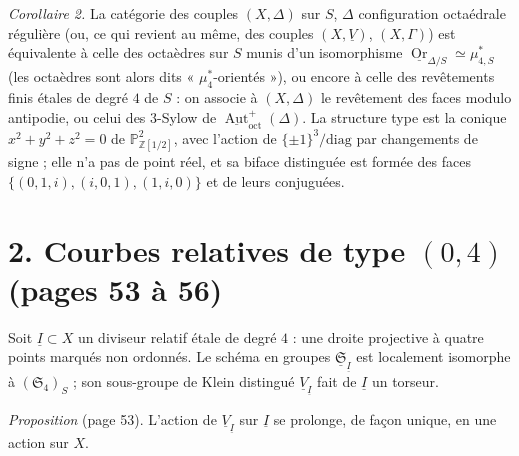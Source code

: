 \documentclass[11pt,a4paper]{article}
\begin{document}
\emph{Corollaire 2.} La catégorie des couples $(X, \Delta)$ sur $S$, $\Delta$
configuration octaédrale régulière (ou, ce qui revient au même, des couples
$(X, \underline{V})$, $(X, \Gamma)$) est équivalente à celle des octaèdres
sur $S$ munis d'un isomorphisme $\underline{\operatorname{Or}}_{\Delta/S}
\simeq \mu^{*}_{4,S}$ (les octaèdres sont alors dits « $\mu_4^{*}$-orientés »), ou encore à celle des
revêtements finis étales de degré $4$ de $S$ : on associe à $(X, \Delta)$ le
revêtement des faces modulo antipodie, ou celui des $3$-Sylow de
$\underline{\operatorname{Aut}}^{+}_{\mathrm{oct}}(\Delta)$. La structure type
est la conique $x^2 + y^2 + z^2 = 0$ de $\mathbb{P}^2_{\mathbb{Z}[1/2]}$, avec
l'action de $\{\pm 1\}^3 / \mathrm{diag}$ par changements de signe ; elle n'a pas
de point réel, et sa biface distinguée est formée des faces $\{(0,1,i), (i,0,1),
(1,i,0)\}$ et de leurs conjuguées.

\section*{2. Courbes relatives de type $(0,4)$ (pages 53 à 56)}

Soit $\underline{I} \subset X$ un diviseur relatif étale de degré $4$ : une
droite projective à quatre points marqués non ordonnés. Le schéma en groupes
$\underline{\mathfrak{S}}_{\underline{I}}$ est localement isomorphe à
$(\mathfrak{S}_4)_S$ ; son sous-groupe de Klein distingué
$\underline{V}_{\underline{I}}$ fait de $\underline{I}$ un torseur.

\emph{Proposition} (page 53). L'action de $\underline{V}_{\underline{I}}$ sur
$\underline{I}$ se prolonge, de façon unique, en une action sur $X$.
\end{document}
